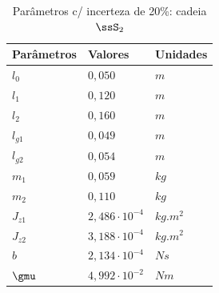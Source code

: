 \documentclass[]{politex}
\begin{document}
\begin{multicols}{2}
\begin{table}[H] 
\centering
\caption{Parâmetros c/ incerteza de 20\%: cadeia $\ssS_2$}
\label{tab:parametrosSimulacao4}
\begin{tabular}{l|l|l}
Parâmetros   & Valores                    & Unidades   \\ \hline
$l_0$        & $0{,}050$                    & $m$        \\
$l_1$        & $0{,}120$                    & $m$        \\
$l_2$        & $0{,}160$                    & $m$        \\
$l_{g1}$     & $0{,}049$                    & $m$        \\
$l_{g2}$     & $0{,}054$                    & $m$        \\
$m_1$        & $0{,}059$                    & $kg$       \\
$m_2$        & $0{,}110$                    & $kg$       \\
$J_{z1}$     & $2{,}486   \cdot 10^{-4}$    & $kg.m^{2}$ \\
$J_{z2}$     & $3{,}188   \cdot 10^{-4}$    & $kg.m^{2}$ \\
$b$          & $2{,}134 \cdot 10^{-4}$      & $N s$      \\
$\gmu$       & $4{,}992 \cdot 10^{-2}$      & $Nm$        \\
\end{tabular}
\end{table}
\end{multicols}
\end{document}
